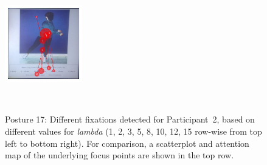 \documentclass[11pt]{asaproc}
\begin{document}
\begin{figure}[t]
\begin{center}
\includegraphics[width=0.30\textwidth]{figures/Subject13_scanpath_posture17_lambda_15.jpg}
\end{center} ~\\[-1.5cm]
\caption{\label{Fixations17}Posture 17: Different fixations detected for Participant~2, based on different values
for {\it lambda} (1, 2, 3, 5, 8, 10, 12, 15 row-wise from top left to bottom right). For comparison,
a scatterplot and attention map of the underlying focus points are shown in the top row.}
\end{figure}
\end{document}
